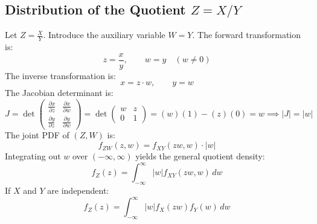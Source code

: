 \documentclass[12pt,a4paper]{article}
\begin{document}
\subsection{Distribution of the Quotient $Z = X / Y$}
\begin{tcolorbox}[examplebox, title={\textbf{Derivation: PDF of the Quotient of Two Random Variables}}]
Let $Z = \frac{X}{Y}$. Introduce the auxiliary variable $W = Y$.
The forward transformation is:
\begin{equation}
  z = \frac{x}{y}, \qquad w = y \quad (w \ne 0)
\end{equation}
The inverse transformation is:
\begin{equation}
  x = z \cdot w, \qquad y = w
\end{equation}
The Jacobian determinant is:
\begin{equation}
  J = \det \begin{pmatrix} \frac{\partial x}{\partial z} & \frac{\partial x}{\partial w} \\[4pt] \frac{\partial y}{\partial z} & \frac{\partial y}{\partial w} \end{pmatrix} = \det \begin{pmatrix} w & z \\ 0 & 1 \end{pmatrix} = (w)(1) - (z)(0) = w \implies |J| = |w|
\end{equation}
The joint PDF of $(Z, W)$ is:
\begin{equation}
  f_{ZW}(z, w) = f_{XY}(z w, w) \cdot |w|
\end{equation}
Integrating out $w$ over $(-\infty, \infty)$ yields the general quotient density:
\begin{equation}
  f_Z(z) = \int_{-\infty}^\infty |w| f_{XY}(z w, w) \, dw
\end{equation}
If $X$ and $Y$ are independent:
\begin{equation}
  f_Z(z) = \int_{-\infty}^\infty |w| f_X(z w) f_Y(w) \, dw
\end{equation}
\end{tcolorbox}
\end{document}
